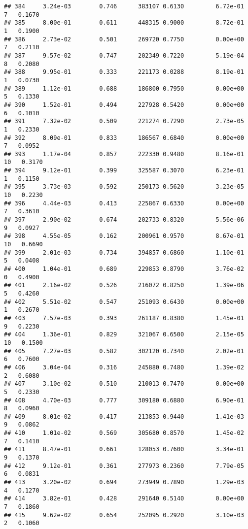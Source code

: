 \documentclass[
]{article}
\begin{document}
\begin{verbatim}
## 384     3.24e-03        0.746      383107 0.6130         6.72e-01   7   0.1670
## 385     8.00e-01        0.611      448315 0.9000         8.72e-01   1   0.1900
## 386     2.73e-02        0.501      269720 0.7750         0.00e+00   7   0.2110
## 387     9.57e-02        0.747      202349 0.7220         5.19e-04   8   0.2080
## 388     9.95e-01        0.333      221173 0.0288         8.19e-01   1   0.0730
## 389     1.12e-01        0.688      186800 0.7950         0.00e+00   5   0.1330
## 390     1.52e-01        0.494      227928 0.5420         0.00e+00   6   0.1010
## 391     7.32e-02        0.509      221274 0.7290         2.73e-05   1   0.2330
## 392     8.09e-01        0.833      186567 0.6840         0.00e+00   7   0.0952
## 393     1.17e-04        0.857      222330 0.9480         8.16e-01  10   0.3170
## 394     9.12e-01        0.399      325587 0.3070         6.23e-01   1   0.1150
## 395     3.73e-03        0.592      250173 0.5620         3.23e-05  10   0.2230
## 396     4.44e-03        0.413      225867 0.6330         0.00e+00   7   0.3610
## 397     2.90e-02        0.674      202733 0.8320         5.56e-06   9   0.0927
## 398     4.55e-05        0.162      200961 0.9570         8.67e-01  10   0.6690
## 399     2.01e-03        0.734      394857 0.6860         1.10e-01   5   0.0408
## 400     1.04e-01        0.689      229853 0.8790         3.76e-02   0   0.4900
## 401     2.16e-02        0.526      216072 0.8250         1.39e-06   5   0.4260
## 402     5.51e-02        0.547      251093 0.6430         0.00e+00   1   0.2670
## 403     7.57e-03        0.393      261187 0.8380         1.45e-01   9   0.2230
## 404     1.36e-01        0.829      321067 0.6500         2.15e-05  10   0.1500
## 405     7.27e-03        0.582      302120 0.7340         2.02e-01   6   0.7600
## 406     3.04e-04        0.316      245880 0.7480         1.39e-02   2   0.6080
## 407     3.10e-02        0.510      210013 0.7470         0.00e+00   5   0.2330
## 408     4.70e-03        0.777      309180 0.6880         6.90e-01   8   0.0960
## 409     8.01e-02        0.417      213853 0.9440         1.41e-03   9   0.0862
## 410     1.01e-02        0.569      305680 0.8570         1.45e-02   7   0.1410
## 411     8.47e-01        0.661      128053 0.7600         3.34e-01   9   0.1370
## 412     9.12e-01        0.361      277973 0.2360         7.79e-05   6   0.0831
## 413     3.20e-02        0.694      273949 0.7890         1.29e-03   4   0.1270
## 414     3.82e-01        0.428      291640 0.5140         0.00e+00   7   0.1860
## 415     9.62e-02        0.654      252095 0.2920         3.10e-03   2   0.1060

\end{verbatim}
\end{document}
